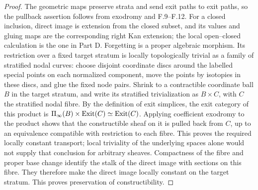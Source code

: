 \begin{proof}
The geometric maps preserve strata and send exit paths to exit paths,
so the pullback assertion follows from exodromy and F.9--F.12.  For a
closed inclusion, direct image is extension from the closed subset,
and its values and gluing maps are the corresponding right Kan
extension; the local open--closed calculation is the one in Part D.
Forgetting is a proper algebraic morphism.  Its restriction over a
fixed target stratum is locally topologically trivial as a family of
stratified nodal curves: choose disjoint coordinate discs around the
labelled special points on each normalized component, move the
points by isotopies in these discs, and glue the fixed node pairs.
Shrink to a contractible coordinate ball $B$ in the target stratum,
and write its stratified trivialization as $B\times C$, with $C$ the
stratified nodal fibre.  By the definition of exit simplices, the exit
category of this product is
$\Pi_\infty(B)\times\operatorname{Exit}(C)\simeq\operatorname{Exit}(C)$.  Applying coefficient
exodromy to the product shows that the constructible sheaf on it is
pulled back from $C$, up to an equivalence compatible with restriction
to each fibre.  This proves the required locally constant transport;
local triviality of the underlying spaces alone would not supply that
conclusion for arbitrary sheaves.  Compactness of the fibre and proper
base change identify
the stalk of the direct image with sections on this fibre.  They
therefore make the direct image locally constant on the target
stratum.  This proves preservation of constructibility.


\end{proof}
